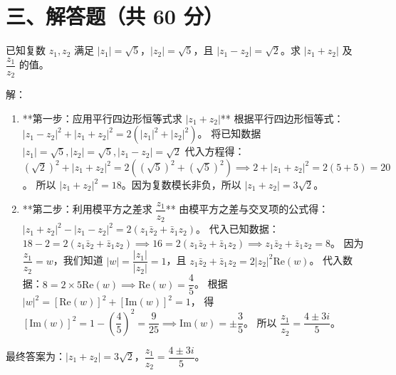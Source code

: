 \documentclass{exam-zh}
\newcounter{solstep}
\begin{document}
\section*{三、解答题（共 60 分）}


\begin{problem}[points=15]
  已知复数 $z_1, z_2$ 满足 $|z_1| = \sqrt{5}$，$|z_2| = \sqrt{5}$，且 $|z_1 - z_2| = \sqrt{2}$。求 $|z_1 + z_2|$ 及 $\dfrac{z_1}{z_2}$ 的值。
  \setcounter{solstep}{0}
  \begin{solutionblock}
    解：
\begin{enumerate}
  \item **第一步：应用平行四边形恒等式求 $|z_1 + z_2|$**
  根据平行四边形恒等式：$|z_1 - z_2|^2 + |z_1 + z_2|^2 = 2(|z_1|^2 + |z_2|^2)$。
  将已知数据 $|z_1| = \sqrt{5}, |z_2| = \sqrt{5}, |z_1 - z_2| = \sqrt{2}$ 代入方程得：
  $(\sqrt{2})^2 + |z_1 + z_2|^2 = 2((\sqrt{5})^2 + (\sqrt{5})^2) \implies 2 + |z_1 + z_2|^2 = 2(5 + 5) = 20$。
  所以 $|z_1 + z_2|^2 = 18$。因为复数模长非负，所以 $|z_1 + z_2| = 3\sqrt{2}$。
  
  \item **第二步：利用模平方之差求 $\dfrac{z_1}{z_2}$**
  由模平方之差与交叉项的公式得：
  $|z_1 + z_2|^2 - |z_1 - z_2|^2 = 2(z_1\bar{z}_2 + \bar{z}_1z_2)$。
  代入已知数据：$18 - 2 = 2(z_1\bar{z}_2 + \bar{z}_1z_2) \implies 16 = 2(z_1\bar{z}_2 + \bar{z}_1z_2) \implies z_1\bar{z}_2 + \bar{z}_1z_2 = 8$。
  因为 $\dfrac{z_1}{z_2} = w$，我们知道 $|w| = \dfrac{|z_1|}{|z_2|} = 1$，且 $z_1\bar{z}_2 + \bar{z}_1z_2 = 2|z_2|^2 \mathrm{Re}(w)$。
  代入数据：$8 = 2 \times 5 \mathrm{Re}(w) \implies \mathrm{Re}(w) = \dfrac{4}{5}$。
  根据 $|w|^2 = [\mathrm{Re}(w)]^2 + [\mathrm{Im}(w)]^2 = 1$，
  得 $[\mathrm{Im}(w)]^2 = 1 - \left(\dfrac{4}{5}\right)^2 = \dfrac{9}{25} \implies \mathrm{Im}(w) = \pm\dfrac{3}{5}$。
  所以 $\dfrac{z_1}{z_2} = \dfrac{4 \pm 3i}{5}$。
\end{enumerate}
最终答案为：$|z_1 + z_2| = 3\sqrt{2}$，$\dfrac{z_1}{z_2} = \dfrac{4 \pm 3i}{5}$。
  \end{solutionblock}
\end{problem}


\end{document}
